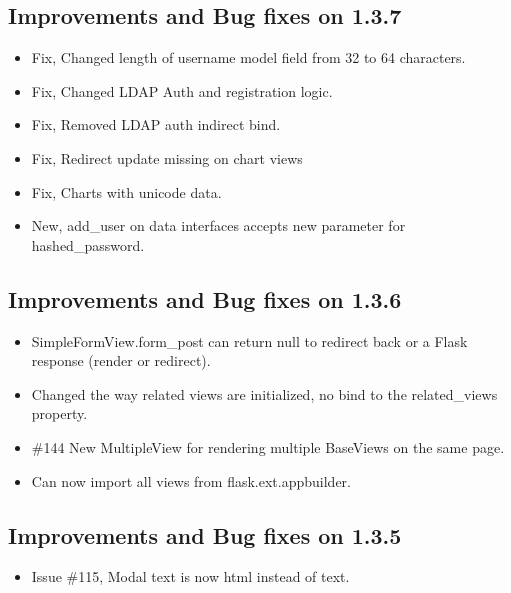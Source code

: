 \documentclass[letterpaper,10pt,english]{sphinxmanual}
\begin{document}
\subsection{Improvements and Bug fixes on 1.3.7}
\label{versions:improvements-and-bug-fixes-on-1-3-7}\begin{itemize}
\item {} 
Fix, Changed length of username model field from 32 to 64 characters.

\item {} 
Fix, Changed LDAP Auth and registration logic.

\item {} 
Fix, Removed LDAP auth indirect bind.

\item {} 
Fix, Redirect update missing on chart views

\item {} 
Fix, Charts with unicode data.

\item {} 
New, add\_user on data interfaces accepts new parameter for hashed\_password.

\end{itemize}


\subsection{Improvements and Bug fixes on 1.3.6}
\label{versions:improvements-and-bug-fixes-on-1-3-6}\begin{itemize}
\item {} 
SimpleFormView.form\_post can return null to redirect back or a Flask response (render or redirect).

\item {} 
Changed the way related views are initialized, no bind to the related\_views property.

\item {} 
\#144 New MultipleView for rendering multiple BaseViews on the same page.

\item {} 
Can now import all views from flask.ext.appbuilder.

\end{itemize}


\subsection{Improvements and Bug fixes on 1.3.5}
\label{versions:improvements-and-bug-fixes-on-1-3-5}\begin{itemize}
\item {} 
Issue \#115, Modal text is now html instead of text.

\end{itemize}
\end{document}
